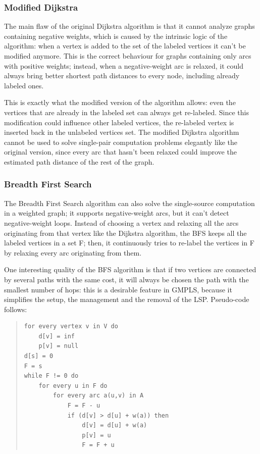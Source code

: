 \documentclass[10pt,a4paper]{report}
\begin{document}
\subsubsection{Modified Dijkstra}

The main flaw of the original Dijkstra algorithm is that it cannot
analyze graphs containing negative weights, which is caused by the
intrinsic logic of the algorithm: when a vertex is added to the set of
the labeled vertices it can't be modified anymore. This is the correct
behaviour for graphs containing only arcs with positive weights;
instead, when a negative-weight arc is relaxed, it could always bring
better shortest path distances to every node, including already
labeled ones.

This is exactly what the modified version of the algorithm allows:
even the vertices that are already in the labeled set can always get
re-labeled. Since this modification could influence other labeled
vertices, the re-labeled vertex is inserted back in the unlabeled
vertices set. The modified Dijkstra algorithm cannot be used to solve
single-pair computation problems elegantly like the original version,
since every arc that hasn't been relaxed could improve the estimated
path distance of the rest of the graph.

\subsubsection{Breadth First Search}

The Breadth First Search algorithm can also solve the single-source
computation in a weighted graph; it supports negative-weight arcs, but
it can't detect negative-weight loops. Instead of choosing a vertex
and relaxing all the arcs originating from that vertex like the
Dijkstra algorithm, the BFS keeps all the labeled vertices in a set F;
then, it continuously tries to re-label the vertices in F by relaxing
every arc originating from them.

One interesting quality of the BFS algorithm is that if two vertices
are connected by several paths with the same cost, it will always be
chosen the path with the smallest number of hops: this is a desirable
feature in GMPLS, because it simplifies the setup, the management and
the removal of the LSP. Pseudo-code follows:

\begin{quote}
\begin{lstlisting}
for every vertex v in V do
    d[v] = inf
    p[v] = null
d[s] = 0
F = s
while F != 0 do
    for every u in F do
        for every arc a(u,v) in A
            F = F - u
            if (d[v] > d[u] + w(a)) then
                d[v] = d[u] + w(a)
                p[v] = u
                F = F + u
\end{lstlisting}
\end{quote}
\end{document}

